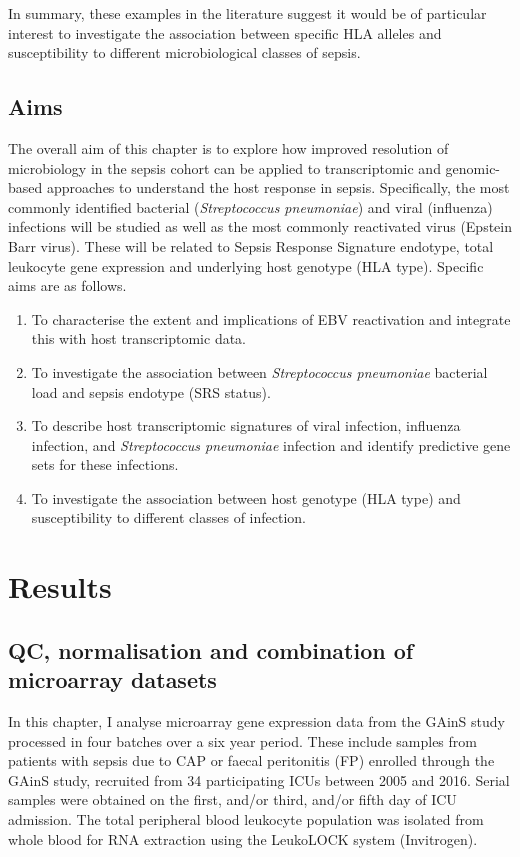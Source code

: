 In summary, these examples in the literature suggest it would be of particular interest to investigate the association between specific HLA alleles and susceptibility to different microbiological classes of sepsis. 

\subsection{Aims}
The overall aim of this chapter is to explore how improved resolution of microbiology in the sepsis cohort can be applied to transcriptomic and genomic-based approaches to understand the host response in sepsis. Specifically, the most commonly identified bacterial (\textit{Streptococcus pneumoniae}) and viral (influenza) infections will be studied as well as the most commonly reactivated virus (Epstein Barr virus). These will be related to Sepsis Response Signature endotype, total leukocyte gene expression and underlying host genotype (HLA type). Specific aims are as follows.

\begin{enumerate}
	\item To characterise the extent and implications of EBV reactivation and integrate this with host transcriptomic data.
	\item To investigate the association between \textit{Streptococcus pneumoniae} bacterial load and sepsis endotype (SRS status).
	\item To describe host transcriptomic signatures of viral infection, influenza infection, and \textit{Streptococcus pneumoniae} infection and identify predictive gene sets for these infections.
	\item To investigate the association between host genotype (HLA type) and susceptibility to different classes of infection.
\end{enumerate}

\section{Results}
\subsection{QC, normalisation and combination of microarray datasets}
In this chapter, I analyse microarray gene expression data from the GAinS study processed in four batches over a six year period. These include samples from patients with sepsis due to CAP or faecal peritonitis (FP) enrolled through the GAinS study, recruited from 34 participating ICUs between 2005 and 2016. Serial samples were obtained on the first, and/or third, and/or fifth day of ICU admission. The total peripheral blood leukocyte population was isolated from whole blood for RNA extraction using the LeukoLOCK system (Invitrogen).


